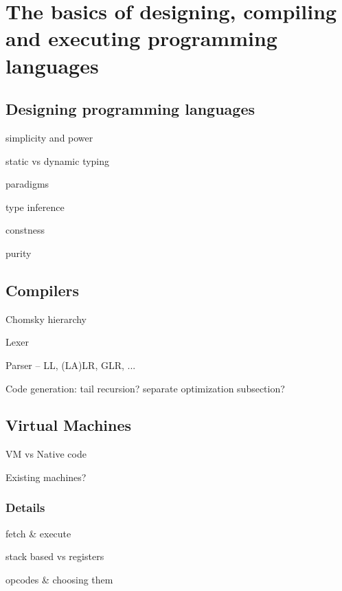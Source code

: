 \chapter{The basics of designing, compiling and executing programming languages}


    \section{Designing programming languages}
    
        simplicity and power
        
        static vs dynamic typing
        
        paradigms
        
        type inference
        
        constness
        
        purity
    
    \section{Compilers}
    
        Chomsky hierarchy
        
        Lexer
        
        Parser -- LL, (LA)LR, GLR, ...
        
        Code generation: tail recursion? separate optimization subsection?
    
    \section{Virtual Machines}
    
        VM vs Native code
        
        Existing machines?
        
        \subsection{Details} %
            fetch \& execute
            
            stack based vs registers
            
            opcodes \& choosing them
            
